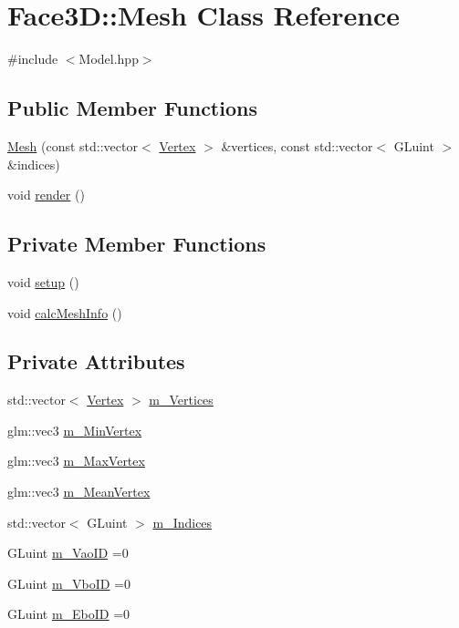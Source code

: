 \hypertarget{class_face3_d_1_1_mesh}{}\section{Face3D\+:\+:Mesh Class Reference}
\label{class_face3_d_1_1_mesh}


{\ttfamily \#include $<$Model.\+hpp$>$}

\subsection*{Public Member Functions}
\begin{DoxyCompactItemize}
\item 
\hyperlink{class_face3_d_1_1_mesh_a4f47ad97eb9ae1e999b9d8a4d4fbf9be}{Mesh} (const std\+::vector$<$ \hyperlink{struct_face3_d_1_1_vertex}{Vertex} $>$ \&vertices, const std\+::vector$<$ G\+Luint $>$ \&indices)
\item 
void \hyperlink{class_face3_d_1_1_mesh_acb8245a0c2988983410da0c43f9699f5}{render} ()
\end{DoxyCompactItemize}
\subsection*{Private Member Functions}
\begin{DoxyCompactItemize}
\item 
void \hyperlink{class_face3_d_1_1_mesh_a103b2560543b838b2271a7aeb4377297}{setup} ()
\item 
void \hyperlink{class_face3_d_1_1_mesh_a89e9b42105ddce6408d18fd795b3b846}{calc\+Mesh\+Info} ()
\end{DoxyCompactItemize}
\subsection*{Private Attributes}
\begin{DoxyCompactItemize}
\item 
std\+::vector$<$ \hyperlink{struct_face3_d_1_1_vertex}{Vertex} $>$ \hyperlink{class_face3_d_1_1_mesh_a471af3fd09f58640e4e279d145a7b757}{m\+\_\+\+Vertices}
\item 
glm\+::vec3 \hyperlink{class_face3_d_1_1_mesh_aac9ab2607f4273a37c504772a00eecbd}{m\+\_\+\+Min\+Vertex}
\item 
glm\+::vec3 \hyperlink{class_face3_d_1_1_mesh_aaa0710a5361684391c957bbf5d88fa3e}{m\+\_\+\+Max\+Vertex}
\item 
glm\+::vec3 \hyperlink{class_face3_d_1_1_mesh_a6063cf010ac6b26b42de7eafdd8eed3c}{m\+\_\+\+Mean\+Vertex}
\item 
std\+::vector$<$ G\+Luint $>$ \hyperlink{class_face3_d_1_1_mesh_ade1ee09c57f88c22ca5f49d5779d6db7}{m\+\_\+\+Indices}
\item 
G\+Luint \hyperlink{class_face3_d_1_1_mesh_a1fee49a00035fde16a18d4befc261a05}{m\+\_\+\+Vao\+ID} =0
\item 
G\+Luint \hyperlink{class_face3_d_1_1_mesh_a1dcd0d3819ab75aac1dd9762048d2a3f}{m\+\_\+\+Vbo\+ID} =0
\item 
G\+Luint \hyperlink{class_face3_d_1_1_mesh_a38779bcc6db79f6a1a30ab66bde3680f}{m\+\_\+\+Ebo\+ID} =0
\end{DoxyCompactItemize}


